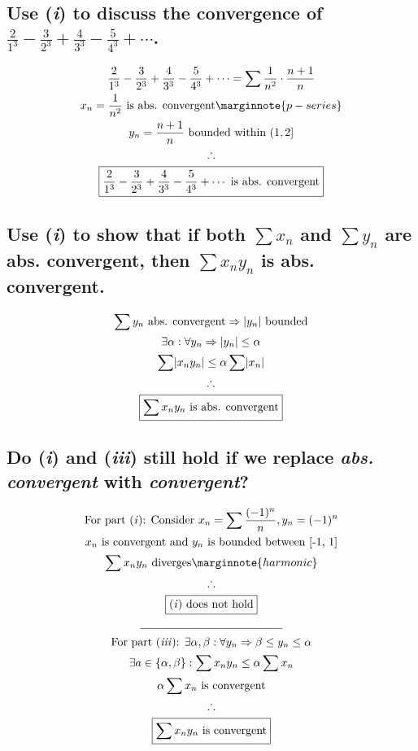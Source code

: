 \documentclass[letterpaper]{article}
\DeclarePairedDelimiter{\abs}{\lvert}{\rvert}
\begin{document}
\subsection{Use (\textit{i}) to discuss the convergence of $\frac{2}{1^3}-\frac{3}{2^3}+\frac{4}{3^3}-\frac{5}{4^3}+\dotsb$.}
\begin{gather*}
\frac{2}{1^3}-\frac{3}{2^3}+\frac{4}{3^3}-\frac{5}{4^3}+\dotsb=\sum\frac{1}{n^2}\cdot\frac{n+1}{n} \\
x_n=\frac{1}{n^2} \text{ is abs. convergent} \marginnote{p-series} \\
y_n=\frac{n+1}{n} \text{ bounded within } (1, 2] \\
\therefore \\
\boxed{\frac{2}{1^3}-\frac{3}{2^3}+\frac{4}{3^3}-\frac{5}{4^3}+\dotsb\text{ is abs. convergent}}
\end{gather*}
\subsection{Use (\textit{i}) to show that if both $\sum x_n$ and $\sum y_n$ are abs. convergent, then $\sum x_ny_n$ is abs. convergent.}
\begin{gather*}
\sum y_n\text{ abs. convergent} \Rightarrow \abs{y_n}\text{ bounded} \\
\exists\alpha:\forall y_n\Rightarrow\abs{y_n}\leq\alpha \\
\sum\abs{x_ny_n}\leq\alpha\sum\abs{x_n} \\
\therefore \\
\boxed{\sum x_ny_n\text{ is abs. convergent}}
\end{gather*}
\subsection{Do (\textit{i}) and (\textit{iii}) still hold if we replace \textit{abs. convergent} with \textit{convergent}?}
\begin{gather*}
\text{For part (\textit{i}): Consider }x_n=\sum\frac{(-1)^n}{n},y_n=(-1)^n \\
x_n\text{ is convergent and }y_n\text{ is bounded between [-1, 1]} \\
\sum x_ny_n\text{ diverges} \marginnote{harmonic} \\
\therefore \\
\boxed{\text{(\textit{i}) does not hold}} \\
\line(1, 0){125} \\
\text{For part (\textit{iii}): } \exists\alpha,\beta:\forall y_n\Rightarrow\beta\leq y_n\leq\alpha \\
\exists a\in\{\alpha,\beta\}:\sum x_ny_n\leq \alpha\sum x_n \\
\alpha\sum x_n \text{ is convergent} \\
\therefore \\
\boxed{\sum x_ny_n\text{ is convergent}}
\end{gather*}
\end{document}
